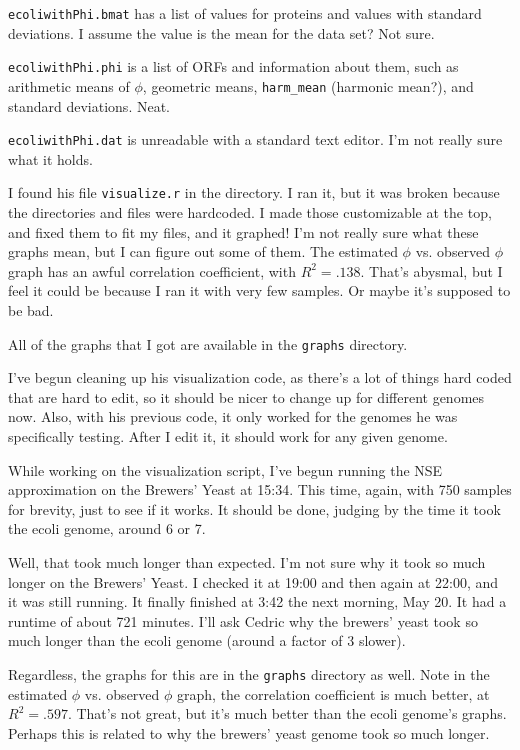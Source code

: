 \documentclass[12 pt]{article}
\begin{document}
\begin{enumerate}
				\texttt{ecoliwithPhi.bmat} has a list of values for proteins and values with standard deviations. I assume the value is the mean for the data set? Not sure.
				
				\texttt{ecoliwithPhi.phi} is a list of ORFs and information about them, such as arithmetic means of $ \phi $, geometric means, \texttt{harm\_mean} (harmonic mean?), and standard deviations. Neat.
				
				\texttt{ecoliwithPhi.dat} is unreadable with a standard text editor. I'm not really sure what it holds.
				
				I found his file \texttt{visualize.r} in the directory. I ran it, but it was broken because the directories and files were hardcoded. I made those customizable at the top, and fixed them to fit my files, and it graphed! I'm not really sure what these graphs mean, but I can figure out some of them. The estimated $ \phi $ vs. observed $ \phi $ graph has an awful correlation coefficient, with $ R^2 = .138 $. That's abysmal, but I feel it could be because I ran it with very few samples. Or maybe it's supposed to be bad.
				
				
				
				All of the graphs that I got are available in the \texttt{graphs} directory. 
				
				I've begun cleaning up his visualization code, as there's a lot of things hard coded that are hard to edit, so it should be nicer to change up for different genomes now. Also, with his previous code, it only worked for the genomes he was specifically testing. After I edit it, it should work for any given genome.
				
				While working on the visualization script, I've begun running the NSE approximation on the Brewers' Yeast at 15:34. This time, again, with 750 samples for brevity, just to see if it works. It should be done, judging by the time it took the ecoli genome, around 6 or 7.
				
				Well, that took much longer than expected. I'm not sure why it took so much longer on the Brewers' Yeast. I checked it at 19:00 and then again at 22:00, and it was still running. It finally finished at 3:42 the next morning, May 20. It had a runtime of about 721 minutes. I'll ask Cedric why the brewers' yeast took so much longer than the ecoli genome (around a factor of 3 slower).
				
				Regardless, the graphs for this are in the \texttt{graphs} directory as well. Note in the estimated $ \phi $ vs. observed $ \phi $ graph, the correlation coefficient is much better, at $ R^2 = .597 $. That's not great, but it's much better than the ecoli genome's graphs. Perhaps this is related to why the brewers' yeast genome took so much longer.
				

\end{enumerate}
\end{document}
